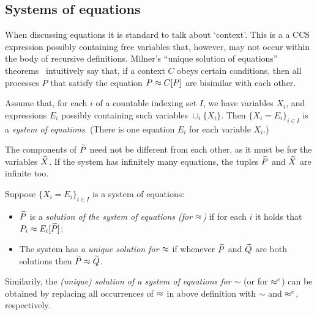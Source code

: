 \subsection{Systems of equations}
\label{ss:SysEq}
When discussing equations it is standard to talk about `context'. This is a 
 a CCS expression  possibly containing  free variables that, however, may not occur within
the body of recursive definitions. 
Milner's ``unique solution of equations'' theorems~\cite{Mil89} intuitively
say that, if a context $C$
obeys certain conditions,
then all processes $P$ that satisfy the equation $P \approx C [P]$ are
bisimilar with each other.

\begin{definition}[equations] %
  \label{def:equation}
Assume that, for each $i$ of 
 a countable indexing set $I$, we have variables $X_i$, and expressions
$E_i$ possibly containing such variables $\cup_i \{ X_i\}$. Then 
$\{ X_i = E_i\}_{i\in I}$ is 
  a \emph{system of equations}. (There is one equation $E_i$ for each variable $X_i$.)
\end{definition}

The components of $\widetilde P$ need not be
different from each other, as it must be for the variables $\widetilde X$.
If the system has infinitely many equations, the  tuples $\widetilde P$ and $\widetilde X$ are infinite too.

\begin{definition}
  \label{def:solution}
Suppose $\{ X_i = E_i\}_{i\in I}$ is a system of equations: 
\begin{itemize}
\item
 $\widetilde P$ is a \emph{solution of the system of equations (for $\approx$)} 
if for each $i$ it holds that $P_i \approx E_i [\widetilde P]$;
\item The system has \emph{a unique solution for $\approx$}  if whenever 
 $\widetilde P$ and $\widetilde Q$ are both solutions then $\widetilde P \approx \widetilde Q$. 
\end{itemize} 
 \end{definition}
Similarily, the \emph{(unique) solution of a system of equations for $\sim$}
(or for $\mathrel{\approx^{\rm{c}}}$) can be obtained by replacing all occurrences of $\approx$
in above definition with $\sim$ and $\mathrel{\approx^{\rm{c}}}$, respectively.

